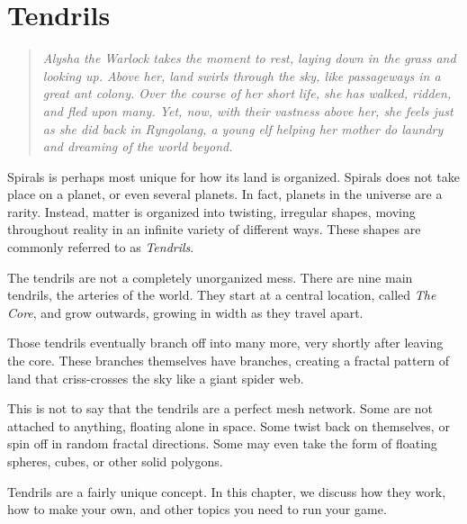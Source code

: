 \chapter{Tendrils}

\begin{quote}
\itshape
Alysha the Warlock takes the moment to rest, laying down in the grass and looking up.
Above her, land swirls through the sky, like passageways in a great ant colony.
Over the course of her short life, she has walked, ridden, and fled upon many.
Yet, now, with their vastness above her, she feels just as she did back in Ryngolang, a young elf helping her mother do laundry and dreaming of the world beyond.
\end{quote}

Spirals is perhaps most unique for how its land is organized.
Spirals does not take place on a planet, or even several planets.
In fact, planets in the universe are a rarity.
Instead, matter is organized into twisting, irregular shapes, moving throughout reality in an infinite variety of different ways.
These shapes are commonly referred to as \textit{Tendrils}.

The tendrils are not a completely unorganized mess.
There are nine main tendrils, the arteries of the world.
They start at a central location, called \textit{The Core}, and grow outwards, growing in width as they travel apart.

Those tendrils eventually branch off into many more, very shortly after leaving the core.
These branches themselves have branches, creating a fractal pattern of land that criss-crosses the sky like a giant spider web.

This is not to say that the tendrils are a perfect mesh network.
Some are not attached to anything, floating alone in space.
Some twist back on themselves, or spin off in random fractal directions.
Some may even take the form of floating spheres, cubes, or other solid polygons.

Tendrils are a fairly unique concept.
In this chapter, we discuss how they work, how to make your own, and other topics you need to run your game.

